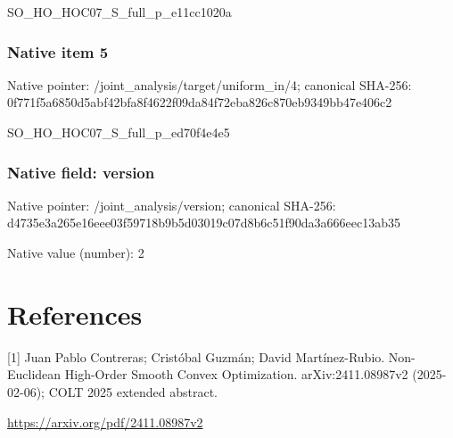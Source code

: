 \documentclass[10pt,a4paper]{article}
\begin{document}
\begingroup\raggedright\sloppy SO\_\allowbreak{}HO\_\allowbreak{}HOC07\_\allowbreak{}S\_\allowbreak{}full\_\allowbreak{}p\_\allowbreak{}e11cc1020a\par\endgroup

\subsubsection{Native item 5}
Native pointer: /joint\_\allowbreak{}analysis/target/uniform\_\allowbreak{}in/4; canonical SHA-256: 0f771f5a6850d5abf42bfa8f4622f09da84f72eba826c870eb9349bb47e406c2

\begingroup\raggedright\sloppy SO\_\allowbreak{}HO\_\allowbreak{}HOC07\_\allowbreak{}S\_\allowbreak{}full\_\allowbreak{}p\_\allowbreak{}ed70f4e4e5\par\endgroup

\subsubsection{Native field: version}
Native pointer: /joint\_\allowbreak{}analysis/version; canonical SHA-256: d4735e3a265e16eee03f59718b9b5d03019c07d8b6c51f90da3a666eec13ab35

Native value (number): 2

\section{References}
[1] Juan Pablo Contreras; Cristóbal Guzmán; David Martínez-Rubio. Non-Euclidean High-Order Smooth Convex Optimization. arXiv:2411.08987v2 (2025-02-06); COLT 2025 extended abstract.

\url{https://arxiv.org/pdf/2411.08987v2}
\end{document}

